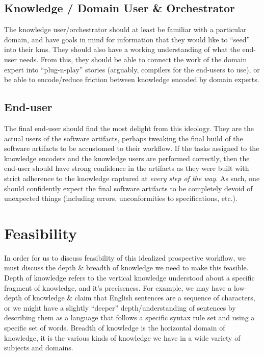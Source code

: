 \subsection{Knowledge / Domain User \& Orchestrator}

The knowledge user/orchestrator should at least be familiar with a particular
domain, and have goals in mind for information that they would like to ``seed''
into their \acl{kms}. They should also have a working understanding of what the
end-user needs. From this, they should be able to connect the work of the domain
expert into ``plug-n-play'' stories (arguably, compilers for the end-users to
use), or be able to encode/reduce friction between knowledge encoded by domain
experts.

\subsection{End-user}

The final end-user should find the most delight from this ideology. They are the
actual users of the software artifacts, perhaps tweaking the final build of the
software artifacts to be accustomed to their workflow. If the tasks assigned to
the knowledge encoders and the knowledge users are performed correctly, then the
end-user should have strong confidence in the artifacts as they were built with
strict adherence to the knowledge captured at \textit{every step of the way}. As
such, one should confidently expect the final software artifacts to be
completely devoid of unexpected things (including errors, unconformities to
specifications, etc.).

\section{Feasibility}
\label{sec:idlgy:feasibility}

In order for us to discuss feasibility of this idealized prospective workflow,
we must discuss the depth \& breadth of knowledge we need to make this feasible.
Depth of knowledge refers to the vertical knowledge understood about a specific
fragment of knowledge, and it's preciseness. For example, we may have a
low-depth of knowledge \& claim that English sentences are a sequence of
characters, or we might have a slightly ``deeper'' depth/understanding  of
sentences by describing them as a language that follows a specific syntax rule
set and using a specific set of words. Breadth of knowledge is the horizontal
domain of knowledge, it is the various kinds of knowledge we have in a wide
variety of subjects and domains.

